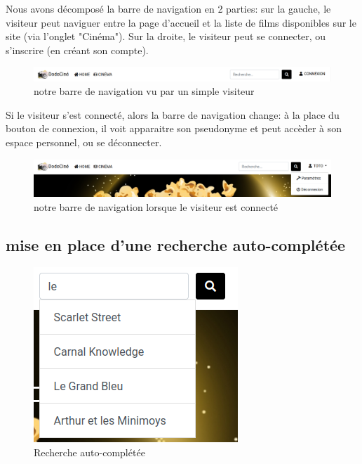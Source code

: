         Nous avons décomposé la barre de navigation en 2 parties: sur la gauche, le visiteur peut naviguer entre la page d'accueil et la liste de films disponibles sur le site (via l'onglet "Cinéma"). Sur la droite, le visiteur peut se connecter, ou s'inscrire (en créant son compte). 

        \begin{figure}[!ht]
            \centering
            \includegraphics[width=16cm]{img/navigation.png}
            \caption{notre barre de navigation vu par un simple visiteur}
        \end{figure}

        Si le visiteur s'est connecté, alors la barre de navigation change: à la place du bouton de connexion, il voit apparaitre son pseudonyme et peut accèder à son espace personnel, ou se déconnecter.

        \begin{figure}[!ht]
            \centering
            \includegraphics[width=16cm]{img/navigation-connect.png}
            \caption{notre barre de navigation lorsque le visiteur est connecté}
        \end{figure}


        \subsection{mise en place d'une recherche auto-complétée}

            \begin{figure}[!ht]
                \centering
                \includegraphics[scale=0.8]{img/recherche-auto.png}
                \caption{Recherche auto-complétée}
            \end{figure}

